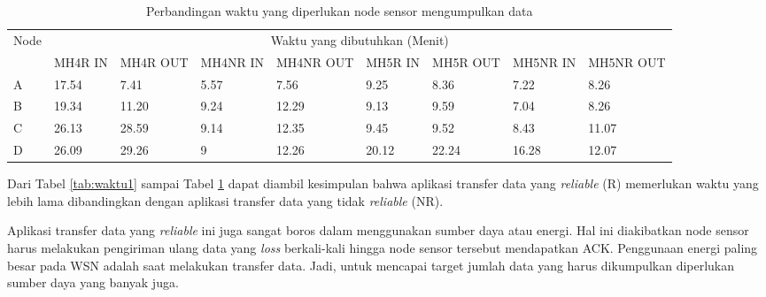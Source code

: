 \begin{table}[H]
  \centering
  \caption{Perbandingan waktu yang diperlukan node sensor mengumpulkan data}
    \begin{tabular}{|p{1.3cm}|p{1.3cm}|p{1.3cm}|p{1.3cm}|p{1.3cm}|p{1.3cm}|p{1.3cm}|p{1.3cm}|p{1.3cm}|}
    \hline
        \multirow{2}{*}{Node}&\multicolumn{8}{|c|}{Waktu yang dibutuhkan (Menit)}\\
        \cline{2-9}
          & MH4R IN & MH4R OUT & MH4NR IN & MH4NR OUT & MH5R IN & MH5R OUT & MH5NR IN & MH5NR OUT \\
        \hline
    A     & 17.54 & 7.41  & 5.57  & 7.56  & 9.25  & 8.36  & 7.22  & 8.26 \\
    B     & 19.34 & 11.20  & 9.24  & 12.29 & 9.13  & 9.59  & 7.04  & 8.26 \\
    C     & 26.13 & 28.59 & 9.14  & 12.35 & 9.45  & 9.52  & 8.43  & 11.07 \\
    D     & 26.09 & 29.26 & 9     & 12.26 & 20.12 & 22.24 & 16.28 & 12.07 \\
    \hline
    \end{tabular}%
  \label{tab:waktu3}%
\end{table}%

Dari Tabel \ref{tab:waktu1} sampai Tabel \ref{tab:waktu3} dapat diambil kesimpulan bahwa aplikasi transfer data yang \textit{reliable} (R) memerlukan waktu yang lebih lama dibandingkan dengan aplikasi transfer data yang tidak \textit{reliable} (NR).

Aplikasi transfer data yang \textit{reliable} ini juga sangat boros dalam menggunakan sumber daya atau energi. Hal ini diakibatkan node sensor harus melakukan pengiriman ulang data yang \textit{loss} berkali-kali hingga node sensor tersebut mendapatkan ACK. Penggunaan energi paling besar pada WSN adalah saat melakukan transfer data. Jadi, untuk mencapai target jumlah data yang harus dikumpulkan diperlukan sumber daya yang banyak juga.

